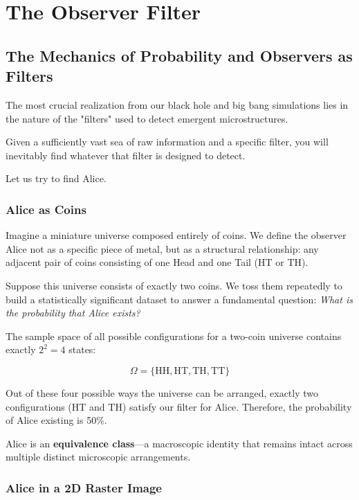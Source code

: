 \chapter{The Observer Filter}
\label{chap:the-filter}

\section{The Mechanics of Probability and Observers as Filters}

The most crucial realization from our black hole and big bang simulations lies in the nature of the "filters" used to detect emergent microstructures.

Given a sufficiently vast sea of raw information and a specific filter, you will inevitably find whatever that filter is designed to detect.

Let us try to find Alice.


\subsection{Alice as Coins}

Imagine a miniature universe composed entirely of coins.
We define the observer Alice not as a specific piece of metal, but as a structural relationship: any adjacent pair of coins consisting of one Head and one Tail (HT or TH).

Suppose this universe consists of exactly two coins.
We toss them repeatedly to build a statistically significant dataset to answer a fundamental question: \emph{What is the probability that Alice exists?}

The sample space of all possible configurations for a two-coin universe contains exactly $2^2 = 4$ states:

\[
\Omega = \{\text{HH}, \text{HT}, \text{TH}, \text{TT}\}
\]

Out of these four possible ways the universe can be arranged, exactly two configurations ($\text{HT}$ and $\text{TH}$) satisfy our filter for Alice.
Therefore, the probability of Alice existing is 50\%. 

Alice is an \textbf{equivalence class}—a macroscopic identity that remains intact across multiple distinct microscopic arrangements.


\subsection{Alice in a 2D Raster Image}

